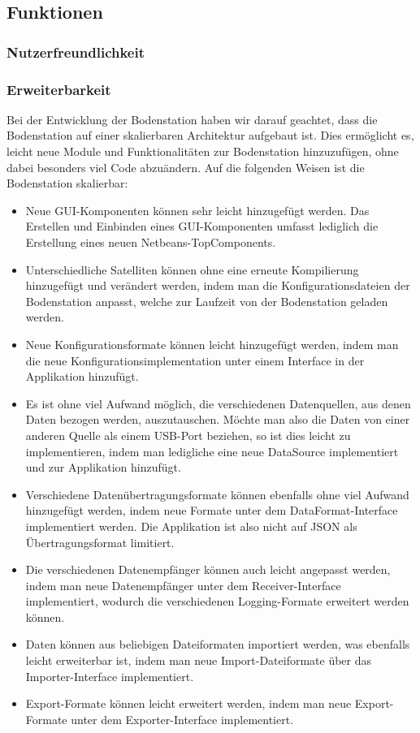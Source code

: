 \subsection{Funktionen}
\subsubsection{Nutzerfreundlichkeit}

\subsubsection{Erweiterbarkeit}
Bei der Entwicklung der Bodenstation haben wir darauf geachtet, dass die Bodenstation auf einer skalierbaren Architektur aufgebaut ist. Dies ermöglicht es, leicht neue Module und Funktionalitäten zur Bodenstation hinzuzufügen, ohne dabei besonders viel Code abzuändern. Auf die folgenden Weisen ist die Bodenstation skalierbar:
\begin{itemize}
	\item Neue GUI-Komponenten können sehr leicht hinzugefügt werden. Das Erstellen und Einbinden eines GUI-Komponenten umfasst lediglich die Erstellung eines neuen Netbeans-TopComponents.
	\item Unterschiedliche Satelliten können ohne eine erneute Kompilierung hinzugefügt und verändert werden, indem man die Konfigurationsdateien der Bodenstation anpasst, welche zur Laufzeit von der Bodenstation geladen werden.
	\item Neue Konfigurationsformate können leicht hinzugefügt werden, indem man die neue Konfigurationsimplementation unter einem Interface in der Applikation hinzufügt.
	\item Es ist ohne viel Aufwand möglich, die verschiedenen Datenquellen, aus denen Daten bezogen werden, auszutauschen. Möchte man also die Daten von einer anderen Quelle als einem USB-Port beziehen, so ist dies leicht zu implementieren, indem man ledigliche eine neue DataSource implementiert und zur Applikation hinzufügt.
	\item Verschiedene Datenübertragungsformate können ebenfalls ohne viel Aufwand hinzugefügt werden, indem neue Formate unter dem DataFormat-Interface implementiert werden. Die Applikation ist also nicht auf JSON als Übertragungsformat limitiert.
	\item Die verschiedenen Datenempfänger können auch leicht angepasst werden, indem man neue Datenempfänger unter dem Receiver-Interface implementiert, wodurch die verschiedenen Logging-Formate erweitert werden können.
	\item Daten können aus beliebigen Dateiformaten importiert werden, was ebenfalls leicht erweiterbar ist, indem man neue Import-Dateiformate über das Importer-Interface implementiert.
	\item Export-Formate können leicht erweitert werden, indem man neue Export-Formate unter dem Exporter-Interface implementiert.
\end{itemize}

